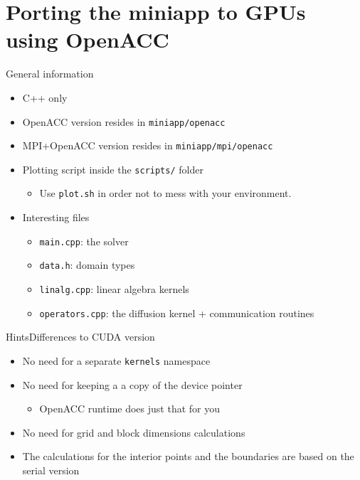 \documentclass[12pt,aspectratio=169]{beamer}
\newcommand\shinline[2][]{\lstinline[style=shstyle,basicstyle=\ttfamily,#1]!#2!}
\begin{document}
\part{Porting the miniapp to GPUs using OpenACC}

\begin{frame}[fragile]{General information}
  \begin{itemize}
  \item C++ only
  \item OpenACC version resides in \shinline{miniapp/openacc}
  \item MPI+OpenACC version resides in \shinline{miniapp/mpi/openacc}
  \item Plotting script inside the \shinline{scripts/} folder
    \begin{itemize}
    \item Use \shinline{plot.sh} in order not to mess with your environment.
    \end{itemize}
  \item Interesting files
    \begin{itemize}
    \item\shinline{main.cpp}: the solver
    \item\shinline{data.h}: domain types
    \item\shinline{linalg.cpp}: linear algebra kernels
    \item\shinline{operators.cpp}: the diffusion kernel + communication routines
    \end{itemize}
  \end{itemize}
\end{frame}

\begin{frame}{Hints}{Differences to CUDA version}
  \begin{itemize}
  \item No need for a separate \texttt{kernels} namespace
  \item No need for keeping a a copy of the device pointer
    \begin{itemize}
    \item OpenACC runtime does just that for you
    \end{itemize}
  \item No need for grid and block dimensions calculations
  \item The calculations for the interior points and the boundaries are based
    on the serial version
  \end{itemize}
\end{frame}
\end{document}
